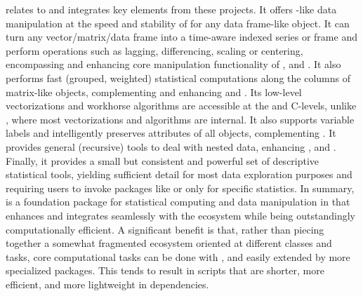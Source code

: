\documentclass[article]{jss}
\begin{document}
 relates to and integrates key elements from these projects. It offers -like data manipulation at the speed and stability of  for any data frame-like object. It can turn any vector/matrix/data frame into a time-aware indexed series or frame and perform operations such as lagging, differencing, scaling or centering, encompassing and enhancing core manipulation functionality of ,  and . It also performs fast (grouped, weighted) statistical computations along the columns of matrix-like objects, complementing and enhancing  and . Its low-level vectorizations and workhorse algorithms are accessible at the  and C-levels, unlike , where most vectorizations and algorithms are internal. It also supports variable labels and intelligently preserves attributes of all objects, complementing . It provides general (recursive) tools to deal with nested data, enhancing ,  and . Finally, it provides a small but consistent and powerful set of descriptive statistical tools, yielding sufficient detail for most data exploration purposes and requiring users to invoke packages like  or  only for specific statistics. In summary,  is a foundation package for statistical computing and data manipulation in  that enhances and integrates seamlessly with the  ecosystem while being outstandingly computationally efficient. A significant benefit is that, rather than piecing together a somewhat fragmented ecosystem oriented at different classes and tasks, core computational tasks can be done with , and easily extended by more specialized packages. This tends to result in  scripts that are shorter, more efficient, and more lightweight in dependencies. \newline
\end{document}
